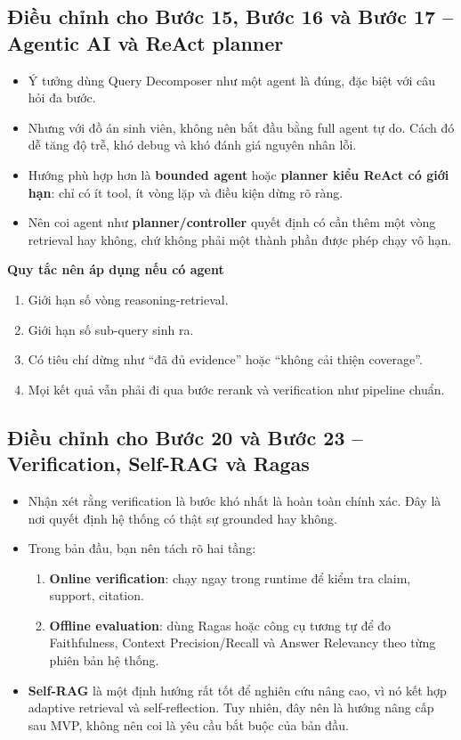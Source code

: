 \documentclass[12pt,a4paper]{article}
\begin{document}
\subsection{Điều chỉnh cho Bước 15, Bước 16 và Bước 17 -- Agentic AI và ReAct planner}

\begin{itemize}
    \item Ý tưởng dùng Query Decomposer như một agent là đúng, đặc biệt với câu hỏi đa bước.
    \item Nhưng với đồ án sinh viên, không nên bắt đầu bằng full agent tự do. Cách đó dễ tăng độ trễ, khó debug và khó đánh giá nguyên nhân lỗi.
    \item Hướng phù hợp hơn là \textbf{bounded agent} hoặc \textbf{planner kiểu ReAct có giới hạn}: chỉ có ít tool, ít vòng lặp và điều kiện dừng rõ ràng.
    \item Nên coi agent như \textbf{planner/controller} quyết định có cần thêm một vòng retrieval hay không, chứ không phải một thành phần được phép chạy vô hạn.
\end{itemize}

\textbf{Quy tắc nên áp dụng nếu có agent}
\begin{enumerate}[label=\arabic*.]
    \item Giới hạn số vòng reasoning-retrieval.
    \item Giới hạn số sub-query sinh ra.
    \item Có tiêu chí dừng như ``đã đủ evidence'' hoặc ``không cải thiện coverage''.
    \item Mọi kết quả vẫn phải đi qua bước rerank và verification như pipeline chuẩn.
\end{enumerate}

\subsection{Điều chỉnh cho Bước 20 và Bước 23 -- Verification, Self-RAG và Ragas}

\begin{itemize}
    \item Nhận xét rằng verification là bước khó nhất là hoàn toàn chính xác. Đây là nơi quyết định hệ thống có thật sự grounded hay không.
    \item Trong bản đầu, bạn nên tách rõ hai tầng:
    \begin{enumerate}[label=\alph*.]
        \item \textbf{Online verification}: chạy ngay trong runtime để kiểm tra claim, support, citation.
        \item \textbf{Offline evaluation}: dùng Ragas hoặc công cụ tương tự để đo Faithfulness, Context Precision/Recall và Answer Relevancy theo từng phiên bản hệ thống.
    \end{enumerate}
    \item \textbf{Self-RAG} là một định hướng rất tốt để nghiên cứu nâng cao, vì nó kết hợp adaptive retrieval và self-reflection. Tuy nhiên, đây nên là hướng nâng cấp sau MVP, không nên coi là yêu cầu bắt buộc của bản đầu.
\end{itemize}
\end{document}
